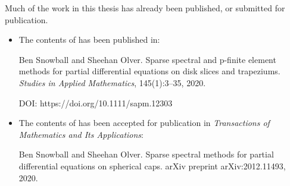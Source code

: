 

\begin{foreword}


Much of the work in this thesis has already been published, or submitted for publication.

\begin{itemize}

\item The contents of  has been published in:

Ben Snowball and Sheehan Olver. Sparse spectral and p-finite element methods for partial differential equations on disk slices and trapeziums. \textit{Studies in Applied Mathematics}, 145(1):3--35, 2020. 

DOI: https://doi.org/10.1111/sapm.12303

\item The contents of  has been accepted for publication in \textit{Transactions of Mathematics and Its Applications}:

Ben Snowball and Sheehan Olver. Sparse spectral methods for partial differential equations on spherical caps. arXiv preprint arXiv:2012.11493, 2020.

\end{itemize}

\end{foreword}
